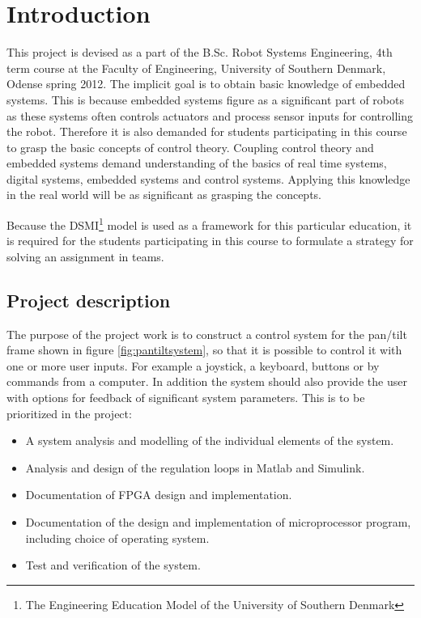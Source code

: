 \chapter{Introduction}\label{chap:intro}

This project is devised as a part of the B.Sc. Robot Systems Engineering, 4th term course at the Faculty of Engineering, University of Southern Denmark, Odense spring 2012. The implicit goal is to obtain basic knowledge of embedded systems. This is because embedded systems figure as a significant part of robots as these systems often controls actuators and process sensor inputs for controlling the robot. Therefore it is also demanded for students participating in this course to grasp the basic concepts of control theory. Coupling control theory and embedded systems demand understanding of the basics of real time systems, digital systems, embedded systems and control systems. Applying this knowledge in the real world will be as significant as grasping the concepts.

Because the DSMI\footnote{The Engineering Education Model of the University of Southern Denmark} model is used as a framework for this particular education, it is required for the students participating in this course to formulate a strategy for solving an assignment in teams.

\section{Project description}
The purpose of the project work is to construct a control system for the pan/tilt frame shown in figure \ref{fig:pantiltsystem}, so that it is possible to control it with one or more user inputs. For example a joystick, a keyboard, buttons or by commands from a computer. In addition the system should also provide the user with options for feedback of significant system parameters. This is to be prioritized in the project:
\begin{itemize}
  \item A system analysis and modelling of the individual elements of the system.
  \item Analysis and design of the regulation loops in Matlab and Simulink.
  \item Documentation of FPGA design and implementation.
  \item Documentation of the design and implementation of microprocessor program, including choice of operating system.
  \item Test and verification of the system.
\end{itemize}



